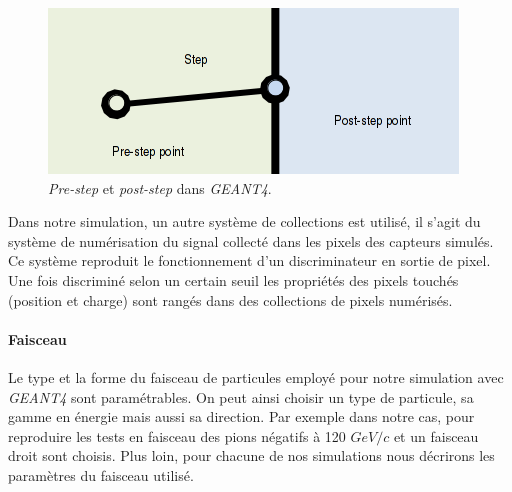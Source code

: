     \begin{figure}[!htb]
     \begin{center} 
      \includegraphics[scale=0.60]{./figures/step_geant4.png}
      \caption{\textit{Pre-step} et \textit{post-step} dans \textit{GEANT4}.}
      \label{fig:step}
     \end{center}
    \end{figure}
    
    Dans notre simulation, un autre syst\`eme de collections est utilis\'e, il s'agit du syst\`eme de num\'erisation du signal collect\'e dans les pixels des capteurs simul\'es. Ce syst\`eme reproduit le fonctionnement d'un discriminateur en sortie de pixel. Une fois discrimin\'e selon un certain seuil les propri\'et\'es des pixels touch\'es (position et charge) sont rang\'es dans des collections de pixels num\'eris\'es.
    
    
    \paragraph{Faisceau}
    
    Le type et la forme du faisceau de particules employ\'e pour notre simulation avec \textit{GEANT4} sont param\'etrables. On peut ainsi choisir un type de particule, sa gamme en énergie mais aussi sa direction. Par exemple dans notre cas, pour reproduire les tests en faisceau des pions n\'egatifs \`a 120 $GeV/c$ et un faisceau droit sont choisis. Plus loin, pour chacune de nos simulations nous d\'ecrirons les paramètres du faisceau utilis\'e.
    
    
    
